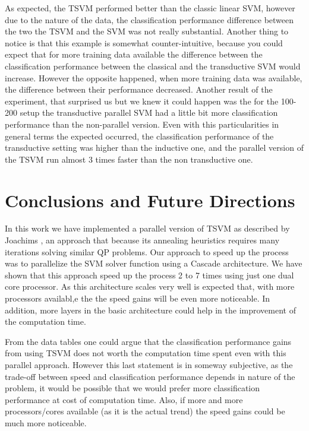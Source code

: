 As expected, the TSVM performed better than the classic linear SVM,
however due to the nature of the data, the classification performance
difference between the two the TSVM and the SVM was not really substantial.
Another thing to notice is that this example is somewhat counter-intuitive,
because you could expect that for more training data available the
difference between the classification performance between the classical
and the transductive SVM would increase. However the opposite happened,
when more training data was available, the difference between their
performance decreased. Another result of the experiment, that surprised
us but we knew it could happen was the for the 100-200 setup the transductive
parallel SVM had a little bit more classification performance than
the non-parallel version. Even with this particularities in general
terms the expected occurred, the classification performance of the
transductive setting was higher than the inductive one, and the parallel
version of the TSVM run almost 3 times faster than the non transductive
one.

\section{Conclusions and Future Directions}

In this work we have implemented a parallel version of TSVM as described
by Joachims \cite{Joachims99c}, an approach that because its annealing
heuristics requires many iterations solving similar QP problems. Our
approach to speed up the process  was to parallelize the
SVM solver function using a Cascade architecture. We have shown that
this approach speed up the process 2 to 7 times using just one dual
core processor. As this architecture scales very well is expected
that, with more processors availabl,e the the speed gains will be even
more noticeable. In addition, more layers in the basic architecture could
help in the improvement of the computation time. 

From the data tables one could argue that the classification performance
gains from using TSVM does not worth the computation time spent even
with this parallel approach. However this last statement is in someway
subjective, as the trade-off between speed and classification performance
depends in nature of the problem, it would be possible that we would
prefer more classification performance at cost of computation time.
Also, if more and more processors/cores available (as it is the actual
trend) the speed gains could be much more noticeable. 

